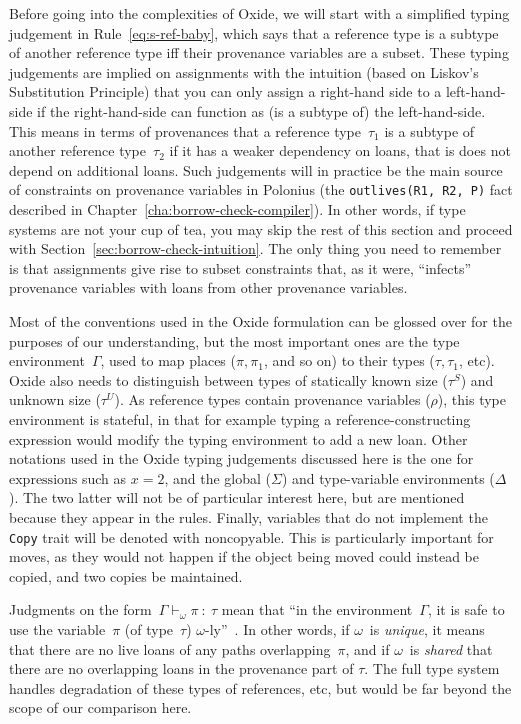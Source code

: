 \documentclass[11pt,a4paper,twoside,openany]{report}
\newcommand{\InRust}[1]{\texttt{#1}}
\newcommand{\InDatalog}[1]{\texttt{#1}}
\newcommand{\expression}[1]{\boxed{#1}}
\newcommand{\decoline}{%
   \par
   \vspace{\baselineskip}
   \hfill
   \ding{100}
   \hfill
   \vspace{\baselineskip}
\par}
\begin{document}
Before going into the complexities of Oxide, we will start with a simplified
typing judgement in Rule~\eqref{eq:s-ref-baby}, which says that a reference type
is a subtype of another reference type iff their provenance variables are a
subset. These typing judgements are implied on assignments with the intuition
(based on Liskov's Substitution Principle) that you can only assign a right-hand
side to a left-hand-side if the right-hand-side can function as (is a subtype
of) the left-hand-side. This means in terms of provenances that a reference
type~$\tau_1$ is a subtype of another reference type~$\tau_2$ if it has a weaker
dependency on loans, that is does not depend on additional loans. Such
judgements will in practice be the main source of constraints on provenance
variables in Polonius (the \InDatalog{outlives(R1, R2, P)} fact described in
Chapter~\ref{cha:borrow-check-compiler}). In other words, if type systems are
not your cup of tea, you may skip the rest of this section and proceed with
Section~\ref{sec:borrow-check-intuition}. The only thing you need to remember is
that assignments give rise to subset constraints that, as it were, ``infects''
provenance variables with loans from other provenance variables.

\decoline{}

Most of the conventions used in the Oxide formulation can be glossed over for
the purposes of our understanding, but the most important ones are the type
environment~$\Gamma$, used to map places ($\pi, \pi_1$, and so on) to their
types ($\tau, \tau_1$, etc). Oxide also needs to distinguish between types of
statically known size ($\tau^S$) and unknown size ($\tau^U$). As reference types
contain provenance variables ($\rho$), this type environment is stateful, in
that for example typing a reference-constructing expression would modify the
typing environment to add a new loan. Other notations used in the Oxide typing
judgements discussed here is the one for $\expression{\text{expressions}}$ such
as $\expression{x = 2}$, and the global ($\Sigma$) and type-variable
environments ($\Delta$). The two latter will not be of particular interest here,
but are mentioned because they appear in the rules. Finally, variables that do
not implement the \InRust{Copy} trait will be denoted with $\text{noncopyable}$.
This is particularly important for moves, as they would not happen if the object
being moved could instead be copied, and two copies be maintained.


Judgments on the form~$\Gamma \vdash_{\omega} \pi \: : \: \tau$ mean that ``in
the environment~$\Gamma$, it is safe to use the variable~$\pi$ (of type~$\tau$)
$\omega$-ly''~\cite{weiss_oxide:_2019}. In other words, if $\omega$~is
\emph{unique}, it means that there are no live loans of any paths
overlapping~$\pi$, and if $\omega$~is \emph{shared} that there are no
overlapping loans in the provenance part of $\tau$. The full type system handles
degradation of these types of references, etc, but would be far beyond the scope
of our comparison here.
\end{document}
